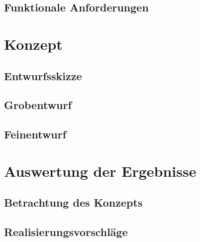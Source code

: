 \documentclass{hswpaper}
\begin{document}
\subsection{Funktionale Anforderungen}

\section{Konzept}
\subsection{Entwurfsskizze}
\subsection{Grobentwurf}
\subsection{Feinentwurf}

\section{Auswertung der Ergebnisse}
\subsection{Betrachtung des Konzepts}
\subsection{Realisierungsvorschläge}
\end{document}
